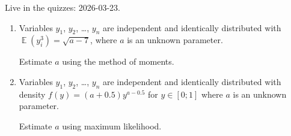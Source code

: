 \documentclass[12pt]{article}
\DeclareMathOperator{\E}{\mathbb{E}}
\begin{document}
Live in the quizzes: 2026-03-23.

\begin{enumerate}
\item Variables $y_1$, $y_2$, \dots, $y_n$ are independent and identically distributed with $\E(y_i^3) = \sqrt{a - 7}$,
where $a$ is an unknown parameter.

Estimate $a$ using the method of moments. 

\item Variables $y_1$, $y_2$, \dots, $y_n$ are independent and identically distributed with density $f(y) = (a + 0.5) y^{a- 0.5}$ for $y \in [0;1]$
where $a$ is an unknown parameter.

Estimate $a$ using maximum likelihood. 
\end{enumerate}
\end{document}
